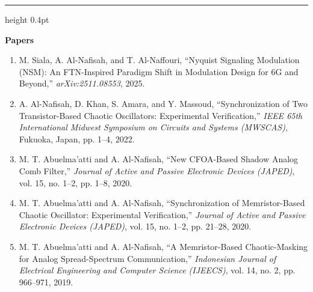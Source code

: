 \documentclass[a4paper,10pt]{article}
\newcommand{\divider}{\par\vspace{2.2mm}\hrule height 0.4pt\vspace{1.6mm}\par\noindent}
\begin{document}
\divider
\noindent\textbf{Papers}
\footnotesize\begin{enumerate}[left=12pt, itemsep=0pt, topsep=1pt]
    \item M. Siala, A. Al-Nafisah, and T. Al-Naffouri, ``Nyquist Signaling Modulation (NSM): An FTN-Inspired Paradigm Shift in Modulation Design for 6G and Beyond,'' \textit{arXiv:2511.08553}, 2025.
    \item A. Al-Nafisah, D. Khan, S. Amara, and Y. Massoud, ``Synchronization of Two Transistor-Based Chaotic Oscillators: Experimental Verification,'' \textit{IEEE 65th International Midwest Symposium on Circuits and Systems (MWSCAS)}, Fukuoka, Japan, pp. 1--4, 2022.
    \item M. T. Abuelma’atti and A. Al-Nafisah, ``New CFOA-Based Shadow Analog Comb Filter,'' \textit{Journal of Active and Passive Electronic Devices (JAPED)}, vol. 15, no. 1--2, pp. 1--8, 2020.
    \item M. T. Abuelma’atti and A. Al-Nafisah, ``Synchronization of Memristor-Based Chaotic Oscillator: Experimental Verification,'' \textit{Journal of Active and Passive Electronic Devices (JAPED)}, vol. 15, no. 1--2, pp. 21--28, 2020.
    \item M. T. Abuelma’atti and A. Al-Nafisah, ``A Memristor-Based Chaotic-Masking for Analog Spread-Spectrum Communication,'' \textit{Indonesian Journal of Electrical Engineering and Computer Science (IJEECS)}, vol. 14, no. 2, pp. 966--971, 2019.
\end{enumerate}\normalsize


\end{document}

